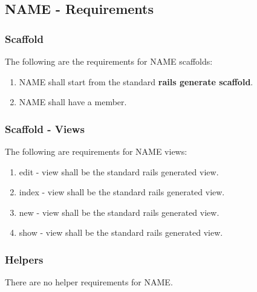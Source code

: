 \subsection{NAME - Requirements}
\label{sec:document_spec} 

\subsubsection{Scaffold}
The following are the requirements for NAME scaffolds:
\begin{enumerate}
	\item NAME shall start from the standard \textbf{rails generate scaffold}.
	\item NAME shall have a \textbf{} member.
\end{enumerate}

\subsubsection{Scaffold - Views}
The following are requirements for NAME views:
\begin{enumerate}
	\item edit - view shall be the standard rails generated view. 

	\item index - view shall be the standard rails generated view. 
	
	\item new - view shall be the standard rails generated view. 
	
	\item show - view shall be the standard rails generated view. 

\end{enumerate}


\subsubsection{Helpers}
There are no helper requirements for NAME.

